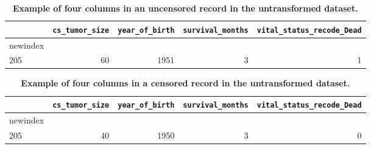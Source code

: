 \documentclass[10pt,letterpaper]{article}
\newcommand{\codewhite}[1]{\colorbox{white}{\texttt{#1}}}
\begin{document}
\begin{table}[!ht]
\begin{adjustwidth}{-2.25in}{0in} %
\caption{\label{tab:originaldead} {\bf Example of four columns in an uncensored record in the untransformed dataset.}}
\begin{tabular}{lrrrr}
\toprule
{} &  \codewhite{cs\_tumor\_size} &  \codewhite{year\_of\_birth} &  \codewhite{survival\_months} &  \codewhite{vital\_status\_recode\_Dead} \\
\midrule
newindex &                &                &        &            \\
205      &             60 &           1951 &      3 &          1 \\
\bottomrule
\end{tabular}
\end{adjustwidth}
\end{table}



\begin{table}[!ht]
\begin{adjustwidth}{-2.25in}{0in} %
\caption{\label{tab:originalalive} {\bf Example of four columns in a censored record in the untransformed dataset.}}
\begin{tabular}{lrrrr}
\toprule
{} &  \codewhite{cs\_tumor\_size} &  \codewhite{year\_of\_birth} &  \codewhite{survival\_months} &  \codewhite{vital\_status\_recode\_Dead} \\
\midrule
newindex &                &                &        &            \\
205      &             40 &           1950 &      3 &          0 \\
\bottomrule
\end{tabular}
\end{adjustwidth}
\end{table}
\end{document}
